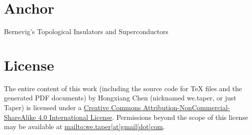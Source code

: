 \documentclass{article}
\numberwithin{equation}{subsection} %
\theoremstyle{definition}
\begin{document}
\section{Anchor}
\label{sec:Anchor}

\begin{thebibliography}{1}
     Bernevig's Topological Insulators and
    Superconductors
\end{thebibliography}
\printnomenclature
\section{License}
The entire content of this work (including the source code
for TeX files and the generated PDF documents) by 
Hongxiang Chen (nicknamed we.taper, or just Taper) is
licensed under a 
\href{http://creativecommons.org/licenses/by-nc-sa/4.0/}{Creative 
Commons Attribution-NonCommercial-ShareAlike 4.0 International 
License}. Permissions beyond the scope of this 
license may be available at \url{mailto:we.taper[at]gmail[dot]com}.
\end{document}

